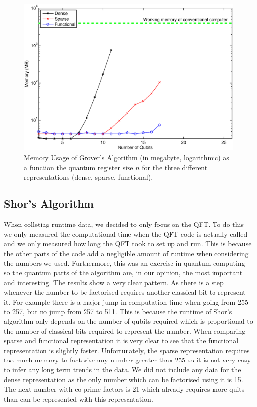 \documentclass[bibliography=totocnumbered, 10pt]{article}
\theoremstyle{NoticeStyle}
\begin{document}
\begin{figure}[H]
	\centering
	\includegraphics[width=\textwidth]{img/Grover_Memory_Performance_log.eps}
	\caption{Memory Usage of Grover's Algorithm (in megabyte, logarithmic) as a function the quantum register size $n$ for the three different representations (dense, sparse, functional).}
	\label{grover_memory_log}
\end{figure}



\subsection{Shor's Algorithm}\label{sec:Shor}

When colleting runtime data, we decided to only focus on the QFT. To do this we only measured the computational time when the QFT code is actually called and we only measured how long the QFT took to set up and run. This is because the other parts of the code add a negligible amount of runtime when considering the numbers we used. Furthermore, this was an exercise in quantum computing so the quantum parts of the algorithm are, in our opinion, the most important and interesting.
The results show a very clear pattern. As there is a step whenever the number to be factorised requires another classical bit to represent it. For example there is a major jump in computation time when going from 255 to 257, but no jump from 257 to 511. This is because the runtime of Shor's algorithm only depends on the number of qubits required which is proportional to the number of classical bits required to represent the number.
When comparing sparse and functional representation it is very clear to see that the functional representation is slightly faster. Unfortunately, the sparse representation requires too much memory to factorise any number greater than 255 so it is not very easy to infer any long term trends in the data.
We did not include any data for the dense representation as the only number which can be factorised using it is 15. The next number with co-prime factors is 21 which already requires more quits than can be represented with this representation.
\end{document}
